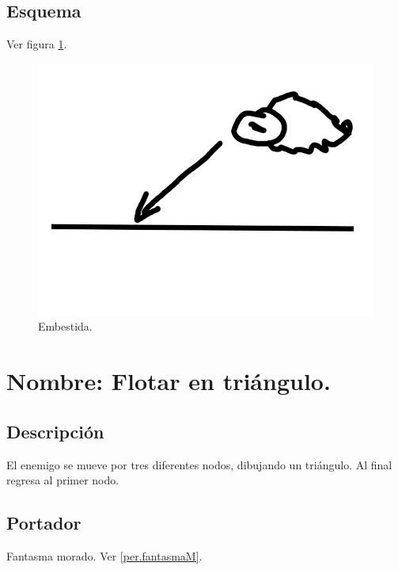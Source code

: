 		\subsection{Esquema}
		Ver figura \ref{fig:embestida}.
		\begin{figure}
			\centering
			\includegraphics[height=0.2 \textheight]{Imagenes/embestida}
			\caption{Embestida.}
			\label{fig:embestida}
		\end{figure}

	\section{Nombre: Flotar en triángulo.} \label{hab.flotarT}
		\subsection{Descripción}
		El enemigo se mueve por tres diferentes nodos, dibujando un triángulo. Al final regresa al primer nodo.
		\subsection{Portador}
		Fantasma morado. Ver \ref{per.fantasmaM}.
